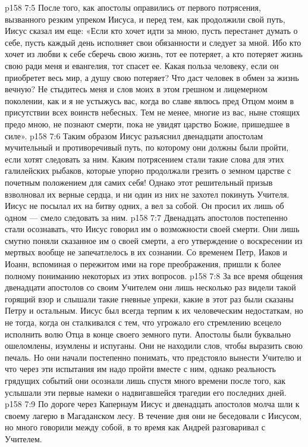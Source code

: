 \vs p158 7:5 После того, как апостолы оправились от первого потрясения, вызванного резким упреком Иисуса, и перед тем, как продолжили свой путь, Иисус сказал им еще: «Если кто хочет идти за мною, пусть перестанет думать о себе, пусть каждый день исполняет свои обязанности и следует за мной. Ибо кто хочет из любви к себе сберечь свою жизнь, тот ее потеряет, а кто потеряет жизнь свою ради меня и евангелия, тот спасет ее. Какая польза человеку, если он приобретет весь мир, а душу свою потеряет? Что даст человек в обмен за жизнь вечную? Не стыдитесь меня и слов моих в этом грешном и лицемерном поколении, как и я не устыжусь вас, когда во славе явлюсь пред Отцом моим в присутствии всех воинств небесных. Тем не менее, многие из вас, ныне стоящих предо мною, не познают смерти, пока не увидят царство Божие, пришедшее в силе».
\vs p158 7:6 Таким образом Иисус разъяснил двенадцати апостолам мучительный и противоречивый путь, по которому они должны были пройти, если хотят следовать за ним. Каким потрясением стали такие слова для этих галилейских рыбаков, которые упорно продолжали грезить о земном царстве с почетным положением для самих себя! Однако этот решительный призыв взволновал их верные сердца, и ни один из них не захотел покинуть Учителя. Иисус не посылал их на битву одних, а вел за собой. Он просил их лишь об одном --- смело следовать за ним.
\vs p158 7:7 Двенадцать апостолов постепенно стали осознавать, что Иисус говорил им о возможности своей смерти. Они лишь смутно поняли сказанное им о своей смерти, а его утверждение о воскресении из мертвых вообще не запечатлелось в их сознании. Со временем Петр, Иаков и Иоанн, вспоминая о пережитом ими на горе преображения, пришли к более полному пониманию некоторых из этих вопросов.
\vs p158 7:8 За все время общения двенадцати апостолов со своим Учителем они лишь несколько раз видели такой горящий взор и слышали такие гневные упреки, какие в этот раз были сказаны Петру и остальным. Иисус был всегда терпим к их человеческим недостаткам, но не тогда, когда он сталкивался с тем, что угрожало его стремлению всецело исполнить волю Отца в конце своего земного пути. Апостолы были буквально ошеломлены, изумлены и испуганы. Они не находили слов, чтобы выразить свою печаль. Но они начали постепенно понимать, что предстояло вынести Учителю и что через эти испытания им надо пройти вместе с ним, однако реальность грядущих событий они осознали лишь спустя много времени после того, как услышали эти первые намеки о надвигавшейся трагедии его последних дней.
\vs p158 7:9 По дороге через Капернаум Иисус и двенадцать апостолов молча шли к своему лагерю в Магаданском лесу. В течение дня они не беседовали с Иисусом, но много говорили между собой, в то время как Андрей разговаривал с Учителем.

